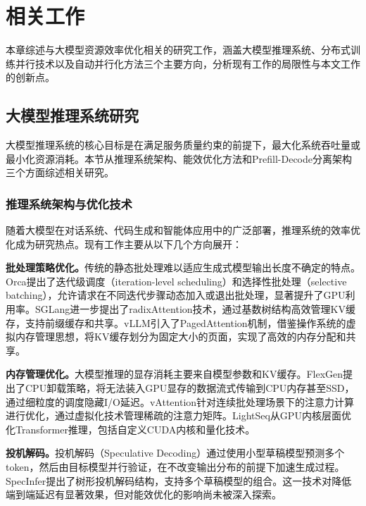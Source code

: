 
\chapter{相关工作}

本章综述与大模型资源效率优化相关的研究工作，涵盖大模型推理系统、分布式训练并行技术以及自动并行化方法三个主要方向，分析现有工作的局限性与本文工作的创新点。

\section{大模型推理系统研究}

大模型推理系统的核心目标是在满足服务质量约束的前提下，最大化系统吞吐量或最小化资源消耗。本节从推理系统架构、能效优化方法和Prefill-Decode分离架构三个方面综述相关研究。

\subsection{推理系统架构与优化技术}

随着大模型在对话系统、代码生成和智能体应用中的广泛部署，推理系统的效率优化成为研究热点。现有工作主要从以下几个方向展开：

\textbf{批处理策略优化。}传统的静态批处理难以适应生成式模型输出长度不确定的特点。Orca\cite{yu2022orca}提出了迭代级调度（iteration-level scheduling）和选择性批处理（selective batching），允许请求在不同迭代步骤动态加入或退出批处理，显著提升了GPU利用率。SGLang\cite{zheng2024sglang}进一步提出了radixAttention技术，通过基数树结构高效管理KV缓存，支持前缀缓存和共享。vLLM\cite{kwon2023efficient}引入了PagedAttention机制，借鉴操作系统的虚拟内存管理思想，将KV缓存划分为固定大小的页面，实现了高效的内存分配和共享。

\textbf{内存管理优化。}大模型推理的显存消耗主要来自模型参数和KV缓存。FlexGen\cite{sheng2023flexgen}提出了CPU卸载策略，将无法装入GPU显存的数据流式传输到CPU内存甚至SSD，通过细粒度的调度隐藏I/O延迟。vAttention\cite{prabhu2025vattention}针对连续批处理场景下的注意力计算进行优化，通过虚拟化技术管理稀疏的注意力矩阵。LightSeq\cite{wang2021lightseq}从GPU内核层面优化Transformer推理，包括自定义CUDA内核和量化技术。

\textbf{投机解码。}投机解码（Speculative Decoding）\cite{miao2024specinfer,stern2018blockwise}通过使用小型草稿模型预测多个token，然后由目标模型并行验证，在不改变输出分布的前提下加速生成过程。SpecInfer\cite{miao2024specinfer}提出了树形投机解码结构，支持多个草稿模型的组合。这一技术对降低端到端延迟有显著效果，但对能效优化的影响尚未被深入探索。

